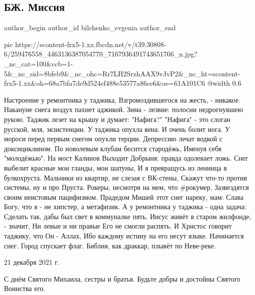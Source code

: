  
 
 
 
 
 
\subsection{БЖ. Миссия}
\label{sec:21_11_2021.fb.bilchenko_evgenia.4.missia}
 
\ifcmt
 author_begin
   author_id bilchenko_evgenia
 author_end
\fi


\ifcmt
  pic https://scontent-frx5-1.xx.fbcdn.net/v/t39.30808-6/259476558_4463136387054770_7167936491743651766_n.jpg?_nc_cat=100&ccb=1-5&_nc_sid=8bfeb9&_nc_ohc=Rr7LH2SrzhAAX9vJvP2&_nc_ht=scontent-frx5-1.xx&oh=68a7bfa7de9d524ef488e53577a86ce6&oe=61A101C6
  @width 0.6
\fi

\begin{multicols}{2}
\obeycr
Настроение у ремонтника у таджика,
Взгромоздившегося на жесть, - никакое.
Накануне снега воздух пахнет аджикой.
Зима - лезвие: полосни недрогнувшею рукою.
\smallskip
Таджик лезет на крышу и думает: "Нафига?"
"Нафига" - это слоган русской, мля, экзистенции.
У таджика опухла вена. И очень болит нога. 
У мороси перед первым снегом опухли терции.
\smallskip
Депрессию лечат водкой с доксициклином.
По новолевым клубам бесится стародёжь,
Именуя себя "молодёжью". На мост Калинов
Выходит Добрыня: правда одолевает ложь.
\smallskip
Снег выбелит красные мои гланды, мои шатуны,
И я превращусь из ленинца в булкохруста.
Мальчики из квартир, не слезая с ВК-стены,
Скажут что-то против системы, ну и про Пруста.
\smallskip
Рокеры, несмотря на мем, что \#рокумер,
Зазвездятся своим неистовым пацифизмом. 
Прадедом Мишей этот снег нареку, мам:
Слава Богу, что я - не хипстер, а метафизик.
\smallskip
А у ремонтника у таджика - одна задача:
Сделать так, дабы был свет в коммуналке пять.
Иисус живёт в старом жилфонде, - значит,
Ни левые и ни правые Его не смогли распять.
\smallskip
И Христос говорит таджику, что Он - Аллах,
Ибо каждому истину на его несут языке.
Начинается снег. Город спускает флаг.
Библия, как драккар, плывёт по Неве-реке.
\restorecr
\end{multicols}

21 декабря 2021 г.

С днём Святого Михаила, сестры и братья. Будьте добры и достойны Святого Воинства его.

